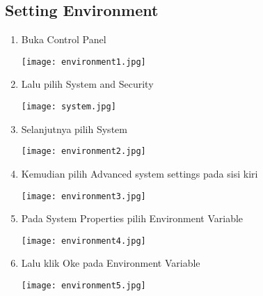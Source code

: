 \documentclass[a4paper,12pt]{report}
\begin{document}
\section{Setting Environment}
\usepackage{Berikut Langkah-Langkah setting Environment:}
\begin{enumerate}
    \item Buka Control Panel
    \begin{center}
        \texttt{[image: environment1.jpg]}
    \end{center}
    \item Lalu pilih System and Security
    \begin{center}
          \texttt{[image: system.jpg]}
    \end{center}
    \item Selanjutnya pilih System
    \begin{center}
          \texttt{[image: environment2.jpg]}
    \end{center}
    \item Kemudian pilih Advanced system settings pada sisi kiri
    \begin{center}
          \texttt{[image: environment3.jpg]}
    \end{center}
    \item Pada System Properties pilih Environment Variable
    \begin{center}
          \texttt{[image: environment4.jpg]}
    \end{center}
    \item Lalu klik Oke pada  Environment Variable
    \begin{center}
        \texttt{[image: environment5.jpg]}
    \end{center}
\end{enumerate}

\chapter{}
\end{document}
